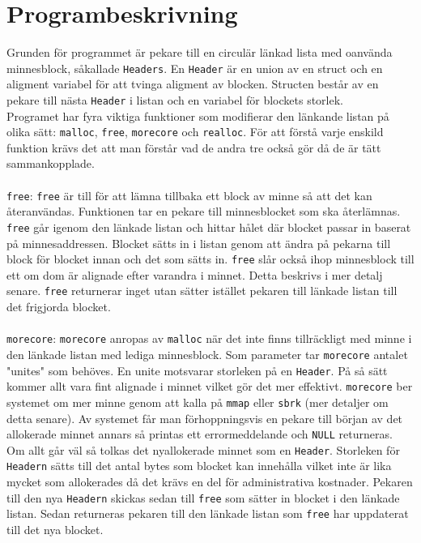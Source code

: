 \documentclass[a4paper]{article}
\begin{document}
\section*{Programbeskrivning}
Grunden för programmet är pekare till en circulär länkad lista med oanvända minnesblock, såkallade \texttt{Headers}. En \texttt{Header} är en union av en struct och en aligment variabel för att tvinga aligment av blocken. Structen består av en pekare till nästa \texttt{Header} i listan och en variabel för blockets storlek.
\\
Programet har fyra viktiga funktioner som modifierar den länkande listan på olika sätt: \texttt{malloc}, \texttt{free}, \texttt{morecore} och \texttt{realloc}. För att förstå varje enskild funktion krävs det att man förstår vad de andra tre också gör då de är tätt sammankopplade. 
\\\\
\texttt{free}: \texttt{free} är till för att lämna tillbaka ett block av minne så att det kan återanvändas. Funktionen tar en pekare till minnesblocket som ska återlämnas. \texttt{free} går igenom den länkade listan och hittar hålet där blocket passar in baserat på minnesaddressen. Blocket sätts in i listan genom att ändra på pekarna till block för blocket innan och det som sätts in. \texttt{free} slår också ihop minnesblock till ett om dom är alignade efter varandra i minnet. Detta beskrivs i mer detalj senare. \texttt{free} returnerar inget utan sätter istället pekaren till länkade listan till det frigjorda blocket.
\\\\
\texttt{morecore}: \texttt{morecore} anropas av \texttt{malloc} när det inte finns tillräckligt med minne i den länkade listan med lediga minnesblock. Som parameter tar \texttt{morecore} antalet "unites" som behöves. En unite motsvarar storleken på en \texttt{Header}. På så sätt kommer allt vara fint alignade i minnet vilket gör det mer effektivt. \texttt{morecore} ber systemet om mer minne genom att kalla på \texttt{mmap} eller \texttt{sbrk} (mer detaljer om detta senare). Av systemet får man förhoppningsvis en pekare till början av det allokerade minnet annars så printas ett errormeddelande och \texttt{NULL} returneras. Om allt går väl så tolkas det nyallokerade minnet som en \texttt{Header}. Storleken för \texttt{Headern} sätts till det antal bytes som blocket kan innehålla vilket inte är lika mycket som allokerades då det krävs en del för administrativa kostnader. Pekaren till den nya \texttt{Headern} skickas sedan till \texttt{free} som sätter in blocket i den länkade listan. Sedan returneras pekaren till den länkade listan som \texttt{free} har uppdaterat till det nya blocket.
\end{document}
